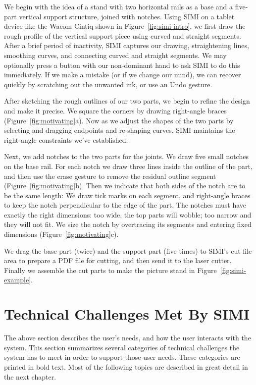 We begin with the idea of a stand with two horizontal rails as a base
and a five-part vertical support structure, joined with notches. Using
SIMI on a tablet device like the Wacom Cintiq shown in
Figure~\ref{fig:simi-intro}, we first draw the rough profile of the
vertical support piece using curved and straight segments. After a
brief period of inactivity, SIMI captures our drawing, straightening
lines, smoothing curves, and connecting curved and straight
segments. We may optionally press a button with our non-dominant hand
to ask SIMI to do this immediately. If we make a mistake (or if we
change our mind), we can recover quickly by scratching out the
unwanted ink, or use an Undo gesture.

After sketching the rough outlines of our two parts, we begin to
refine the design and make it precise.  We square the corners by
drawing right-angle braces (Figure~\ref{fig:motivating}a).  Now as we
adjust the shapes of the two parts by selecting and dragging endpoints
and re-shaping curves, SIMI maintains the right-angle constraints
we've established.
 
Next, we add notches to the two parts for the joints. We draw five
small notches on the base rail. For each notch we draw three lines
inside the outline of the part, and then use the erase gesture to
remove the residual outline segment (Figure~\ref{fig:motivating}b).
Then we indicate that both sides of the notch are to be the same
length: We draw tick marks on each segment, and right-angle braces to
keep the notch perpendicular to the edge of the part. The notches must
have exactly the right dimensions: too wide, the top parts will
wobble; too narrow and they will not fit. We size the notch by
overtracing its segments and entering fixed dimensions
(Figure~\ref{fig:motivating}c).
 
We drag the base part (twice) and the support part (five times) to
SIMI's cut file area to prepare a PDF file for cutting, and then send
it to the laser cutter.  Finally we assemble the cut parts to make the
picture stand in Figure~\ref{fig:simi-example}.



\section{Technical Challenges Met By SIMI}

The above section describes the user's needs, and how the user
interacts with the system. This section summarizes several categories
of technical challenges the system has to meet in order to support
those user needs. These categories are printed in bold text. Most of
the following topics are described in great detail in the next
chapter.

